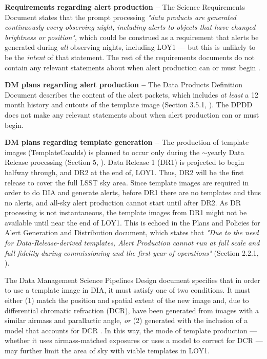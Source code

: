 \documentclass[DM,lsstdraft,toc]{lsstdoc}
\begin{document}
{\bf Requirements regarding alert production --} The Science Requirements Document  states that the prompt processing {\it "data products are generated continuously every observing night, including alerts to objects that have changed brightness or position"}, which could be construed as a requirement that alerts be generated during {\it all} observing nights, including LOY1 --- but this is unlikely to be the {\em intent} of that statement. The rest of the requirements documents do not contain any relevant statements about when alert production can or must begin .

{\bf DM plans regarding alert production --} The Data Products Definition Document describes the content of the alert packets, which includes {\em at least} a 12 month history and cutouts of the template image (Section 3.5.1, ). The DPDD does not make any relevant statements about when alert production can or must begin.

{\bf DM plans regarding template generation --} The production of template images (TemplateCoadds) is planned to occur only during the $\sim$yearly Data Release processing (Section 5, ). Data Release 1 (DR1) is projected to begin halfway through, and DR2 at the end of, LOY1. Thus, DR2 will be the first release to cover the full LSST sky area. Since template images are required in order to do DIA and generate alerts, before DR1 there are no templates and thus no alerts, and all-sky alert production cannot start until after DR2. As DR processing is not instantaneous, the template images from DR1 might not be available until near the end of LOY1. This is echoed in the Plans and Policies for Alert Generation and Distribution document, which states that {\it "Due to the need for Data-Release-derived templates, Alert Production cannot run at full scale and full fidelity during commissioning and the first year of operations"} (Section 2.2.1, ).

The Data Management Science Pipelines Design document specifies that in order to use a template image in DIA, it must satisfy one of two conditions. It must either (1) match the position and spatial extent of the new image and, due to differential chromatic refraction (DCR), have been generated from images with a similar airmass and parallactic angle, {\em or} (2) generated with the inclusion of a model that accounts for DCR . In this way, the mode of template production --- whether it uses airmass-matched exposures or uses a model to correct for DCR --- may further limit the area of sky with viable templates in LOY1.
\end{document}
